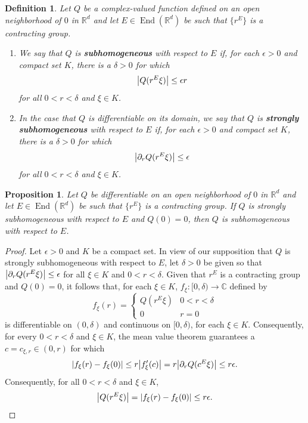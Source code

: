 \documentclass[11pt]{article}
\newtheorem{definition}[theorem]{Definition}
\newtheorem{proposition}[theorem]{Proposition}
\theoremstyle{remark}
\newcommand\End{\operatorname{End}} %
\begin{document}
\begin{definition}\label{def:homogeneous_types}
Let $Q$ be a complex-valued function defined on an open neighborhood of $0$ in $\mathbb{R}^d$ and let $E\in\End(\mathbb{R}^d)$ be such that $\{r^E\}$ is a contracting group.
\begin{enumerate}
\item We say that $Q$ is \textbf{subhomogeneous} with respect to $E$ if, for each $\epsilon>0$ and compact set $K$, there is a $\delta>0$ for which
\begin{equation*}
\abs{Q(r^E\xi)}\leq \epsilon r
\end{equation*}
for all $0<r<\delta$ and $\xi\in K$.
\item In the case that $Q$ is differentiable on its domain, we say that $Q$ is \textbf{strongly subhomogeneous} with respect to $E$ if, for each $\epsilon>0$ and compact set $K$, there is a $\delta>0$ for which
\begin{equation*}
\abs{\partial_r Q(r^E\xi)}\leq \epsilon
\end{equation*}
for all $0<r<\delta$ and $\xi\in K$.
\end{enumerate}
\end{definition}

\begin{proposition}\label{prop:supersub_implies_sub}
Let $Q$ be differentiable on an open neighborhood of $0$ in $\mathbb{R}^d$ and let $E\in\End(\mathbb{R}^d)$ be such that $\{r^E\}$ is a contracting group. If $Q$ is strongly subhomogeneous with respect to $E$ and $Q(0)=0$, then $Q$ is subhomogeneous with respect to $E$.
\end{proposition}
\begin{proof}
Let $\epsilon>0$ and $K$ be a compact set.  In view of our supposition that $Q$ is strongly subhomogeneous with respect to $E$, let $\delta>0$ be given so that $\abs{\partial_r Q(r^E\xi)}\leq \epsilon$ for all $\xi\in K$ and $0<r< \delta$. Given that $r^E$ is a contracting group and $Q(0)=0$, it follows that, for each $\xi\in K$, $f_{\xi}:[0,\delta)\to\mathbb{C}$ defined by
\begin{equation*}
f_{\xi}(r)=\begin{cases}
Q(r^E\xi) & 0<r<\delta\\
0 & r=0
\end{cases}
\end{equation*}
is differentiable on $(0,\delta)$ and continuous on $[0,\delta)$, for each $\xi\in K$. Consequently, for every $0<r<\delta$ and $\xi\in K$, the mean value theorem guarantees a $c=c_{\xi,r}\in (0,r)$ for which 
\begin{equation*}
\abs{f_{\xi}(r)-f_{\xi}(0)}\leq r\abs{f_{\xi}'(c)}=r\abs{\partial_r Q(c^E\xi)}\leq r\epsilon.
\end{equation*}
Consequently, for all $0<r<\delta$ and $\xi\in K$,
\begin{equation*}
\abs{Q(r^E\xi)}=\abs{f_{\xi}(r)-f_{\xi}(0)}\leq r\epsilon.
\end{equation*}
\end{proof}
\end{document}
